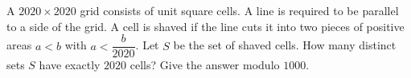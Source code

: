 A $2020\times2020$ grid consists of unit square cells. A line is required to be parallel to a side of the grid. A cell is shaved if the line cuts it into two pieces of positive areas $a<b$ with $a<\dfrac{b}{2020}$. Let $S$ be the set of shaved cells. How many distinct sets $S$ have exactly $2020$ cells? Give the answer modulo $1000$.
